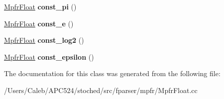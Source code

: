 \begin{DoxyCompactItemize}
\hyperlink{class_mpfr_float}{Mpfr\+Float} {\bfseries const\+\_\+pi} ()
\item 
\mbox{\label{class_mpfr_float_1_1_mpfr_float_data_container_ad47f42390b52eb6f1f668d6d7916b647}} 
\hyperlink{class_mpfr_float}{Mpfr\+Float} {\bfseries const\+\_\+e} ()
\item 
\mbox{\label{class_mpfr_float_1_1_mpfr_float_data_container_a69abd534e6e19e2ffe3a176ae82f1df4}} 
\hyperlink{class_mpfr_float}{Mpfr\+Float} {\bfseries const\+\_\+log2} ()
\item 
\mbox{\label{class_mpfr_float_1_1_mpfr_float_data_container_a58dde4f07ab5a7598686babddfee3303}} 
\hyperlink{class_mpfr_float}{Mpfr\+Float} {\bfseries const\+\_\+epsilon} ()
\end{DoxyCompactItemize}


The documentation for this class was generated from the following file\+:\begin{DoxyCompactItemize}
\item 
/\+Users/\+Caleb/\+A\+P\+C524/stoched/src/fparser/mpfr/Mpfr\+Float.\+cc\end{DoxyCompactItemize}
